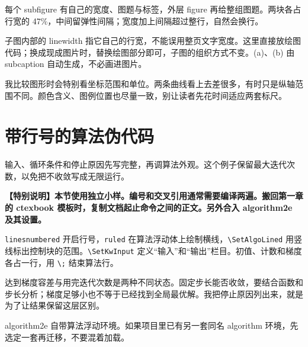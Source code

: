 
每个 subfigure 有自己的宽度、图题与标签，外层 figure 再给整组图题。两块各占行宽的 47\%，中间留弹性间隔；宽度加上间隔超过整行，自然会换行。

子图内部的 linewidth 指它自己的行宽，不能误用整页文字宽度。这里直接放绘图代码；换成现成图片时，替换绘图部分即可，子图的组织方式不变。(a)、(b) 由 subcaption 自动生成，不必画进图片。

我比较图形时会特别看坐标范围和单位。两条曲线看上去差很多，有时只是纵轴范围不同。颜色含义、图例位置也尽量一致，别让读者先花时间适应两套标尺。

\section{带行号的算法伪代码}

输入、循环条件和停止原因先写完整，再调算法外观。这个例子保留最大迭代次数，以免把不收敛写成无限运行。

\begin{tcolorbox}[colback=Teal!4,colframe=Teal,boxrule=.7pt,arc=1mm,fontupper=\small\bfseries]\textbf{【特别说明】本节使用独立小样。编号和交叉引用通常需要编译两遍。搬回第一章的 ctexbook 模板时，复制文档起止命令之间的正文。另外合入 algorithm2e 及其设置。}\end{tcolorbox}


\texttt{linesnumbered} 开启行号，\texttt{ruled} 在算法浮动体上绘制横线，\verb|\SetAlgoLined| 用竖线标出控制块的范围。\verb|\SetKwInput| 定义“输入”和“输出”栏目。初值、计数和梯度各占一行，用 \verb|\;| 结束算法行。

达到梯度容差与用完迭代次数是两种不同状态。固定步长能否收敛，要结合函数和步长分析；梯度足够小也不等于已经找到全局最优解。我把停止原因列出来，就是为了让结果保留这层区别。

algorithm2e 自带算法浮动环境。如果项目里已有另一套同名 algorithm 环境，先选定一套再迁移，不要混着加载。
